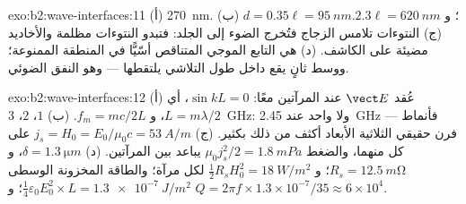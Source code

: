 \begin{solution}{exo:b2:wave-interfaces:11}
(أ) \qty{270}{nm}. (ب) $d = 0.35\ell = \qty{95}{nm}$؛ و $2.3\ell = \qty{620}{nm}$. (ج) النتوءات
تلامس الزجاج فتُخرج الضوء إلى الجلد: فتبدو النتوءات مظلمة
والأخاديد مضيئة على الكاشف. (د)  هي التابع الموجي
المتناقص أسّيًّا في المنطقة الممنوعة؛ ووسط ثانٍ يقع داخل طول
التلاشي يلتقطها --- وهو النفق الضوئي.
\end{solution}

\begin{solution}{exo:b2:wave-interfaces:12}
(أ) عُقد $\vect E$ عند المرآتين معًا: $\sin kL = 0$، أي $L = m\lambda/2$، و $f_m = mc/2L$.
(ب) $1$، $2$، \qty{3}{GHz}: ولا واحد عند \qty{2.45}{GHz} --- فأنماط فرن حقيقي
الثلاثية الأبعاد أكثف من ذلك بكثير. (ج) $j_s = H_0 = E_0/\mu_0c = \qty{53}{A/m}$
على كل منهما، والضغط $\mu_0j_s^2/2 = \qty{1.8}{mPa}$ يباعد بين المرآتين.
(د) $\delta = \qty{1.3}{\micro m}$، و $R_s = \qty{12.5}{m\ohm}$؛ و $\tfrac12R_sH_0^2 =
\qty{18}{W/m^2}$ لكل مرآة؛ والطاقة المخزونة الوسطى $\tfrac14\varepsilon_0E_0^2 \times L = \qty{1.3e-7}{J/m^2}$؛
و $Q = 2\pi f \times 1.3 \times 10^{-7}/35 \approx 6 \times 10^4$.
\end{solution}


